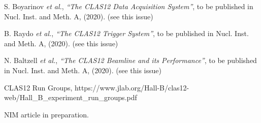 \documentclass[final,3p,twocolumn]{elsarticle}
\begin{document}
\begin{thebibliography}{99}
S. Boyarinov {\it et al.}, {\it ``The CLAS12 Data Acquisition System''}, to be published in Nucl. Inst.
and Meth. A, (2020). (see this issue)

B. Raydo {\it et al.}, {\it ``The CLAS12 Trigger System''}, to be published in Nucl. Inst. and Meth. A, (2020).
(see this issue)

N. Baltzell {\it et al.}, {\it ``The CLAS12 Beamline and its Performance''}, to be published in Nucl. Inst.
and Meth. A, (2020). (see this issue)

CLAS12 Run Groups, https://www.jlab.org/Hall-B/clas12-web/Hall\_B\_experiment\_run\_groups.pdf

 NIM article in preparation. 

\end{thebibliography}

\end{document}
